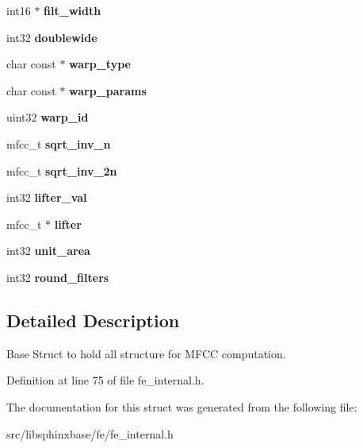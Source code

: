 \begin{DoxyCompactItemize}
\item 
int16 $\ast$ {\bfseries filt\+\_\+width}\label{structmelfb__s_a43c26968a65602f1dce3c02e155eea39}

\item 
int32 {\bfseries doublewide}\label{structmelfb__s_a2f1a3b5e9a985a88dd0a0c57c8e8e682}

\item 
char const $\ast$ {\bfseries warp\+\_\+type}\label{structmelfb__s_a925f6f7a98b33b542f6b53f7c0b1b923}

\item 
char const $\ast$ {\bfseries warp\+\_\+params}\label{structmelfb__s_aa7ba71c21972a822ba7f23391ff92b21}

\item 
uint32 {\bfseries warp\+\_\+id}\label{structmelfb__s_a3b4d756c484accf39aeac42219b2c7ec}

\item 
mfcc\+\_\+t {\bfseries sqrt\+\_\+inv\+\_\+n}\label{structmelfb__s_a1d222190206f979da6f1297197bb6e6b}

\item 
mfcc\+\_\+t {\bfseries sqrt\+\_\+inv\+\_\+2n}\label{structmelfb__s_a09439f191bdf50d17505f0cfcabda229}

\item 
int32 {\bfseries lifter\+\_\+val}\label{structmelfb__s_a605228aea9e9c9028caad09060a07b2e}

\item 
mfcc\+\_\+t $\ast$ {\bfseries lifter}\label{structmelfb__s_a362672e537cb316c538fccc141ad01f8}

\item 
int32 {\bfseries unit\+\_\+area}\label{structmelfb__s_a9fc76cc06249cb211c35c04a31c8a3c1}

\item 
int32 {\bfseries round\+\_\+filters}\label{structmelfb__s_ac2db1578287bd1f5a9b5eed94cc0d987}

\end{DoxyCompactItemize}


\subsection{Detailed Description}
Base Struct to hold all structure for M\+F\+C\+C computation. 



Definition at line 75 of file fe\+\_\+internal.\+h.



The documentation for this struct was generated from the following file\+:\begin{DoxyCompactItemize}
\item 
src/libsphinxbase/fe/fe\+\_\+internal.\+h\end{DoxyCompactItemize}
